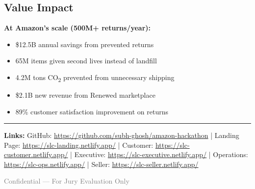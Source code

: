\documentclass[11pt,a4paper]{article}
\begin{document}
\subsection{Value Impact}
\textbf{At Amazon's scale (500M+ returns/year):}
\begin{itemize}[noitemsep]
\item \$12.5B annual savings from prevented returns
\item 65M items given second lives instead of landfill
\item 4.2M tons CO\textsubscript{2} prevented from unnecessary shipping
\item \$2.1B new revenue from Renewed marketplace
\item 89\% customer satisfaction improvement on returns
\end{itemize}

\vspace{1cm}
\textcolor{amazonorange}{\rule{\textwidth}{1pt}}

\vspace{0.5cm}
\textbf{Links:} GitHub: \url{https://github.com/subh-ghosh/amazon-hackathon} | Landing Page: \url{https://slc-landing.netlify.app/} | Customer: \url{https://slc-customer.netlify.app/} | Executive: \url{https://slc-executive.netlify.app/} | Operations: \url{https://slc-ops.netlify.app/} | Seller: \url{https://slc-seller.netlify.app/}

\vspace{1cm}
\begin{center}
{\small\textcolor{gray}{Confidential --- For Jury Evaluation Only}}
\end{center}
\end{document}
